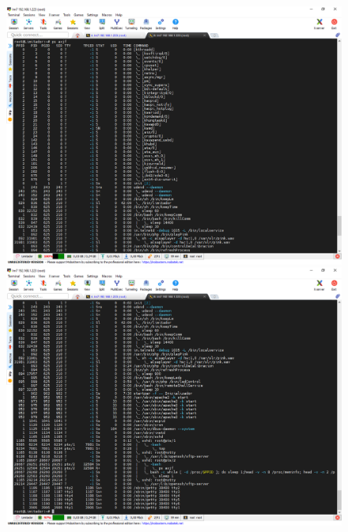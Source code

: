 \begin{figure}[ht]
    \begin{minipage}[b]{.45\textwidth}
        \centering
        \includegraphics[width=1\textwidth]{imagenes/lm7_ps[1].png}
        \caption{}
        \label{img:lms_ps1}
    \end{minipage}
    \hfill
    \begin{minipage}[b]{.45\textwidth}
        \centering
        \includegraphics[width=1\textwidth]{imagenes/lm7_ps[2].png}
        \caption{}
        \label{img:lms_ps2}
    \end{minipage}
\end{figure}


